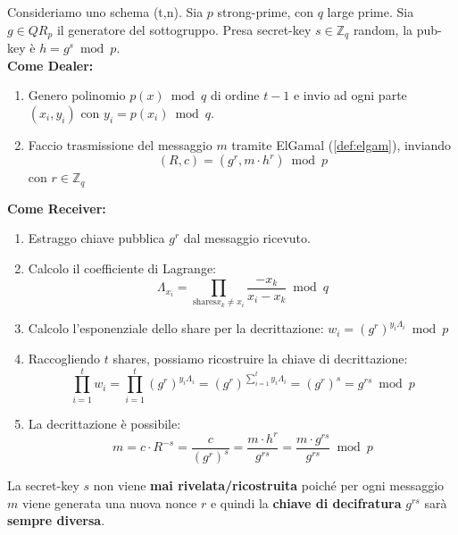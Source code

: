 \begin{definition}\label{def:treshelg}
Consideriamo uno schema (t,n). Sia $p$ strong-prime, con $q$ large prime. Sia $g\in QR_p$ il generatore del sottogruppo. Presa secret-key $s\in\mathbb{Z}_q$ random, la pub-key è $h=g^s\bmod{p}$.\\
\textbf{Come Dealer:}
\begin{enumerate}
    \item Genero polinomio $p(x)\bmod{q}$ di ordine $t-1$ e invio ad ogni parte $(x_i, y_i)$ con $y_i=p(x_i)\bmod{q}$.
    \item Faccio trasmissione del messaggio $m$ tramite ElGamal (\cref{def:elgam}), inviando 
    \[ (R,c)=(g^r,m\cdot h^r)\bmod{p}\]
    con $r\in\mathbb{Z}_q$
\end{enumerate}
\textbf{Come Receiver:}
\begin{enumerate}
    \item Estraggo chiave pubblica $g^r$ dal messaggio ricevuto.
    \item Calcolo il coefficiente di Lagrange:
    \[\Lambda_{x_i}=\prod_{\text{shares} x_k\ne x_i}\frac{-x_k}{x_i-x_k}\bmod{q}\]
    \item Calcolo l'esponenziale dello share per la decrittazione: $w_i=(g^r)^{y_i\Lambda_i}\bmod{p}$
    \item Raccogliendo $t$ shares, possiamo ricostruire la chiave di decrittazione:
    \[\prod_{i=1}^{t}w_i=\prod_{i=1}^{t}(g^r)^{y_i\Lambda_i}=(g^r)^{\sum_{i=1}^{t}{y_i\Lambda_i}}=(g^r)^s=g^{rs}\bmod{p}\]
    \item La decrittazione è possibile: 
    \[m=c\cdot R^{-s}=\frac{c}{(g^r)^s}=\frac{m\cdot h^r}{g^{rs}}=\frac{m\cdot g^{rs}}{g^{rs}}\bmod{p}\]
\end{enumerate}
\begin{remark}
    La secret-key $s$ non viene \textbf{mai rivelata/ricostruita} poiché per ogni messaggio $m$ viene generata una nuova nonce $r$ e quindi la \textbf{chiave di decifratura} $g^{rs}$ sarà \textbf{sempre diversa}.
\end{remark}
\end{definition}
